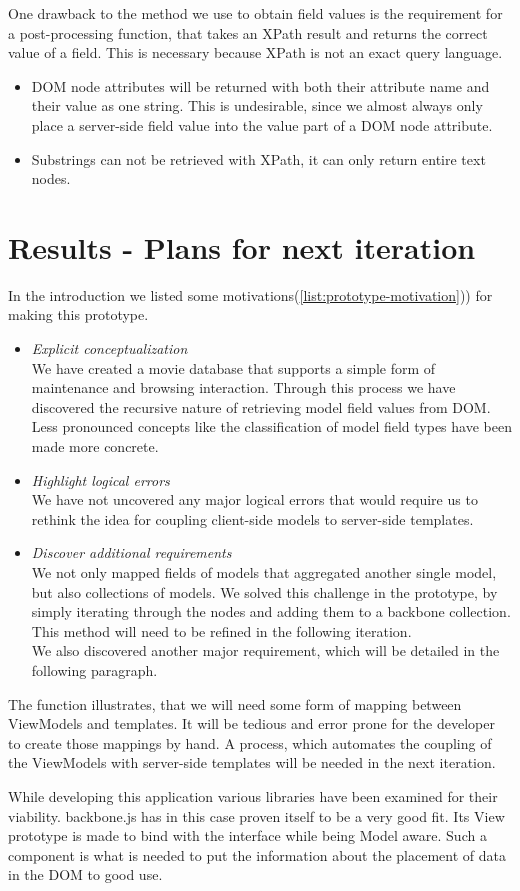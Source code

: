 One drawback to the method we use to obtain field values is the requirement
for a post-processing function, that takes an XPath result and
returns the correct value of a field.
This is necessary because XPath is not an exact query language.
\begin{itemize}
	\item DOM node attributes will be returned with both their attribute name and
	their value as one string. This is undesirable, since we almost always only
	place a server-side field value into the value part of a DOM node attribute.
	\item Substrings can not be retrieved with XPath, it can only return entire
	text nodes.
\end{itemize}

\section{Results - Plans for next iteration}

In the introduction we listed some motivations(\ref{list:prototype-motivation}))
for making this prototype.

\begin{itemize}
	\item \emph{Explicit conceptualization}\\
	We have created a movie database that supports a simple form of maintenance
	and browsing interaction. Through this process we have discovered the
	recursive nature of retrieving model field values from DOM.
	Less pronounced concepts like the classification of model field types have 
	been made more concrete.
	\item \emph{Highlight logical errors}\\
	We have not uncovered any major logical errors that would require us to
	rethink the idea for coupling client-side models to server-side templates.
	\item \emph{Discover additional requirements}\\
	We not only mapped fields of models that aggregated another single model,
	but also collections of models. We solved this challenge in the prototype,
	by simply iterating through the nodes and adding them to
	a backbone collection. This method will need to be refined in the following
	iteration.\\
	We also discovered another major requirement, which will be detailed in the
	following paragraph.
\end{itemize}

The function  illustrates, that we will need some form
of mapping between ViewModels and templates.
It will be tedious and error prone for the developer to create those mappings
by hand. A process, which automates the coupling of the ViewModels with
server-side templates will be needed in the next iteration.

While developing this application various libraries have been examined for their
viability. backbone.js has in this case proven itself to be a very good fit.
Its View prototype is made to bind with the interface while being Model aware.
Such a component is what is needed to put the information about
the placement of data in the DOM to good use.
